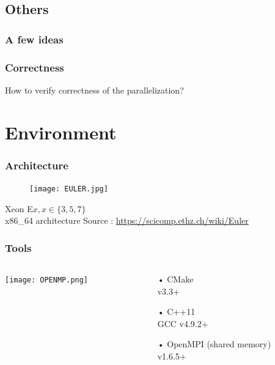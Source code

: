 \documentclass{beamer}
\begin{document}
\subsection{Others}
\begin{frame}
\frametitle{A few ideas}
\end{frame}
\begin{frame}
\frametitle{Correctness}
How to verify correctness of the parallelization?
\end{frame}


\section{Environment}
\begin{frame}
\frametitle{Architecture}
\begin{figure}
\texttt{[image: EULER.jpg]}
\end{figure}


\vspace{.5 cm}

Xeon E$x, x\in\{3, 5, 7\}$\\x86\_64 architecture
\vfill
{
\tiny
Source : 
\url{https://scicomp.ethz.ch/wiki/Euler}
}
\end{frame}
\begin{frame}
\frametitle{Tools}
\begin{columns}
\begin{column}{.4\linewidth}
\texttt{[image: OPENMP.png]}
\end{column}

\begin{column}{.6\linewidth}
\begin{itemize}
\item[•] CMake\\\hspace{.5cm}v3.3+
\vspace{.2cm}
\item[•] C++11\\\hspace{.5cm}GCC v4.9.2+
\vspace{.2cm}
\item[•] OpenMPI (shared memory)\\\hspace{.5cm}v1.6.5+
\end{itemize}
\end{column}
\end{columns}

\end{frame}
\end{document}
